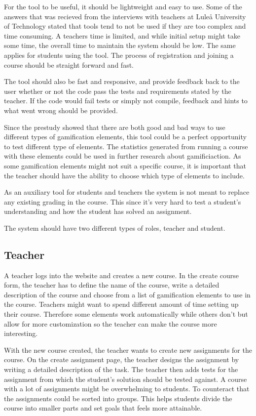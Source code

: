 For the tool to be useful, it should be lightweight and easy to use. Some of the answers that was recieved from the interviews with teachers at Luleå University of Technology stated that tools tend to not be used if they are too complex and time consuming. A teachers time is limited, and while initial setup might take some time, the overall time to maintain the system should be low. The same applies for students using the tool. The process of registration and joining a course should be straight forward and fast.

The tool should also be fast and responsive, and provide feedback back to the user whether or not the code pass the tests and requirements stated by the teacher. If the code would fail tests or simply not compile, feedback and hints to what went wrong should be provided.

Since the prestudy showed that there are both good and bad ways to use different types of gamification elements, this tool could be a perfect opportunity to test different type of elements. The statistics generated from running a course with these elements could be used in further research about gamificiaction. As some gamification elements might not suit a specific course, it is important that the teacher should have the ability to choose which type of elements to include. 

As an auxiliary tool for students and teachers the system is not meant to replace any existing grading in the course. This since it's very hard to test a student's understanding and how the student has solved an assignment. 

The system should have two different types of roles, teacher and student.

\subsection{Teacher}
A teacher logs into the website and creates a new course. In the create course form, the teacher has to define the name of the course, write a detailed description of the course and choose from a list of gamification elements to use in the course. Teachers might want to spend different amount of time setting up their course. Therefore some elements work automatically while others don't but allow for more customization so the teacher can make the course more interesting.

With the new course created, the teacher wants to create new assignments for the course. On the create assignment page, the teacher designs the assignment by writing a detailed description of the task. The teacher then adds tests for the assignment from which the student's solution should be tested against. A course with a lot of assignments might be overwhelming to students. To counteract that the assignments could be sorted into groups. This helps students divide the course into smaller parts and set goals that feels more attainable.

